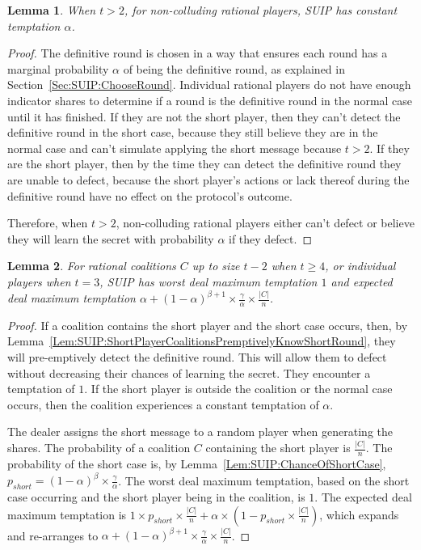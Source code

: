 \documentclass[12pt]{dalcsthesis}
\newtheorem{lemma}{Lemma}
\begin{document}
\begin{lemma}\label{Lem:SUIP:NonColludersNotTemptedExceptT2}When $t > 2$, for non-colluding rational players, SUIP has constant temptation $\alpha$.\end{lemma}
\begin{proof}
The definitive round is chosen in a way that ensures each round has a marginal probability $\alpha$ of being the definitive round, as explained in Section~\ref{Sec:SUIP:ChooseRound}. Individual rational players do not have enough indicator shares to determine if a round is the definitive round in the normal case until it has finished. If they are not the short player, then they can't detect the definitive round in the short case, because they still believe they are in the normal case and can't simulate applying the short message because $t > 2$. If they are the short player, then by the time they can detect the definitive round they are unable to defect, because the short player's actions or lack thereof during the definitive round have no effect on the protocol's outcome.

Therefore, when $t > 2$, non-colluding rational players either can't defect or believe they will learn the secret with probability $\alpha$ if they defect.
\end{proof}

\begin{lemma}\label{Lem:SUIP:AllCoalitionsTempted}For rational coalitions $C$ up to size $t-2$ when $t \geq 4$, or individual players when $t=3$, SUIP has worst deal maximum temptation $1$ and expected deal maximum temptation $\alpha + (1-\alpha)^{\beta+1} \times \frac{\gamma}{\alpha} \times \frac{|C|}{n}$.\end{lemma}
\begin{proof}
If a coalition contains the short player and the short case occurs, then, by Lemma~\ref{Lem:SUIP:ShortPlayerCoalitionsPremptivelyKnowShortRound}, they will pre-emptively detect the definitive round. This will allow them to defect without decreasing their chances of learning the secret. They encounter a temptation of $1$. If the short player is outside the coalition or the normal case occurs, then the coalition experiences a constant temptation of $\alpha$.

The dealer assigns the short message to a random player when generating the shares. The probability of a coalition $C$ containing the short player is $\frac{|C|}{n}$. The probability of the short case is, by Lemma~\ref{Lem:SUIP:ChanceOfShortCase}, $p_{short} = (1-\alpha)^\beta \times \frac{\gamma}{\alpha}$. The worst deal maximum temptation, based on the short case occurring and the short player being in the coalition, is $1$. The expected deal maximum temptation is $1 \times p_{short} \times \frac{|C|}{n} + \alpha \times (1 - p_{short} \times \frac{|C|}{n})$, which expands and re-arranges to $\alpha + (1-\alpha)^{\beta+1} \times \frac{\gamma}{\alpha} \times \frac{|C|}{n}$.
\end{proof}
\end{document}
